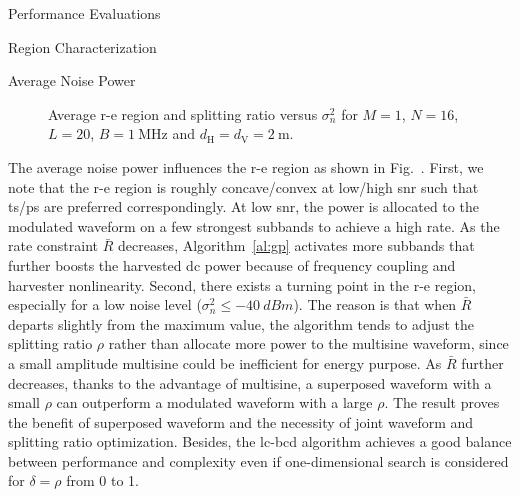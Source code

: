 \begin{section}{Performance Evaluations}
\begin{subsection}{ Region Characterization}
		\begin{subsubsection}{Average Noise Power}
			\begin{figure}[H]
				\centering
				\caption{Average \gls{r-e} region and splitting ratio versus $\sigma_n^2$ for $M=1$, $N=16$, $L=20$, $B=\qty{1}{\MHz}$ and $d_{\mathrm{H}}=d_{\mathrm{V}}=\qty{2}{\meter}$.}
			\end{figure}

			The average noise power influences the \gls{r-e} region as shown in Fig.~. First, we note that the \gls{r-e} region is roughly concave/convex at low/high \gls{snr} such that \gls{ts}/\gls{ps} are preferred correspondingly. At low \gls{snr}, the power is allocated to the modulated waveform on a few strongest subbands to achieve a high rate. As the rate constraint $\bar{R}$ decreases, Algorithm~\ref{al:gp} activates more subbands that further boosts the harvested \gls{dc} power because of frequency coupling and harvester nonlinearity. Second, there exists a turning point in the \gls{r-e} region, especially for a low noise level ($\sigma_n^2 \le \qty{-40}{dBm}$). The reason is that when $\bar{R}$ departs slightly from the maximum value, the algorithm tends to adjust the splitting ratio $\rho$ rather than allocate more power to the multisine waveform, since a small amplitude multisine could be inefficient for energy purpose. As $\bar{R}$ further decreases, thanks to the advantage of multisine, a superposed waveform with a small $\rho$ can outperform a modulated waveform with a large $\rho$. The result proves the benefit of superposed waveform and the necessity of joint waveform and splitting ratio optimization. Besides, the \gls{lc}-\gls{bcd} algorithm achieves a good balance between performance and complexity even if one-dimensional search is considered for $\delta=\rho$ from \num{0} to \num{1}.
		\end{subsubsection}


\end{subsection}
\end{section}

